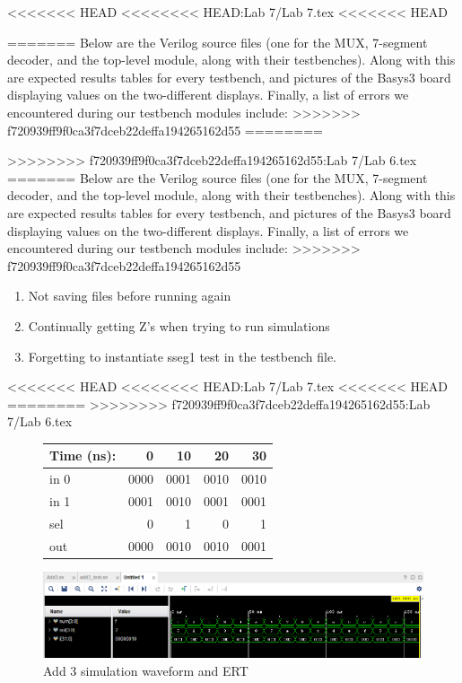 \documentclass[11pt]{article}
\begin{document}
<<<<<<< HEAD
<<<<<<<< HEAD:Lab 7/Lab 7.tex
<<<<<<< HEAD

=======
Below are the Verilog source files (one for the MUX, 7-segment decoder, and the top-level module, along with their testbenches). Along with this are expected results tables for every testbench, and pictures of the Basys3 board displaying values on the two-different displays. Finally, a list of errors we encountered during our testbench modules include:
>>>>>>> f720939ff9f0ca3f7dceb22deffa194265162d55
========

>>>>>>>> f720939ff9f0ca3f7dceb22deffa194265162d55:Lab 7/Lab 6.tex
=======
Below are the Verilog source files (one for the MUX, 7-segment decoder, and the top-level module, along with their testbenches). Along with this are expected results tables for every testbench, and pictures of the Basys3 board displaying values on the two-different displays. Finally, a list of errors we encountered during our testbench modules include:
>>>>>>> f720939ff9f0ca3f7dceb22deffa194265162d55

\begin{enumerate}
	
	\item Not saving files before running again
	
	
	
	\item Continually getting Z's when trying to run simulations
	
	
	
	\item Forgetting to instantiate sseg1 test in the testbench file.
	
	
	
\end{enumerate} 

<<<<<<< HEAD
<<<<<<<< HEAD:Lab 7/Lab 7.tex
<<<<<<< HEAD
========
>>>>>>>> f720939ff9f0ca3f7dceb22deffa194265162d55:Lab 7/Lab 6.tex
\begin{figure}[ht]\centering
	\begin{tabular}{l|rrrr}
		Time (ns): & 0 & 10 & 20 & 30 \\
		\midrule 
		in 0 & 0000 & 0001 & 0010 & 0010 \\
		in 1 & 0001 & 0010 & 0001 & 0001 \\
		sel & 0 & 1 & 0 & 1 \\
		\bottomrule
		out & 0000 & 0010 &0010 &0001 
	\end{tabular}\medskip
	
	\includegraphics[width=1.0\textwidth]{Part1.PNG}
	\caption{Add 3 simulation waveform and ERT}
	\label{fig:sim_with_table}
\end{figure}
\end{document}
